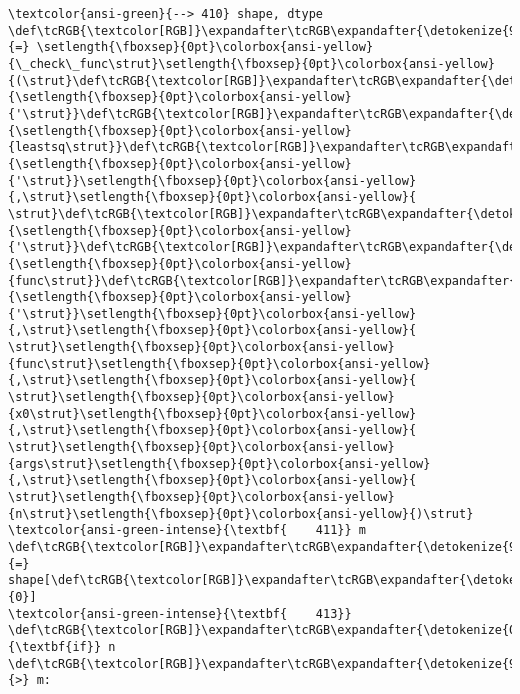 \documentclass[11pt]{article}
\begin{document}
\begin{Verbatim}[commandchars=\\\{\}, frame=single, framerule=2mm, rulecolor=\color{outerrorbackground}]
\textcolor{ansi-green}{--> 410} shape, dtype \def\tcRGB{\textcolor[RGB]}\expandafter\tcRGB\expandafter{\detokenize{98,98,98}}{=} \setlength{\fboxsep}{0pt}\colorbox{ansi-yellow}{\_check\_func\strut}\setlength{\fboxsep}{0pt}\colorbox{ansi-yellow}{(\strut}\def\tcRGB{\textcolor[RGB]}\expandafter\tcRGB\expandafter{\detokenize{175,0,0}}{\setlength{\fboxsep}{0pt}\colorbox{ansi-yellow}{'\strut}}\def\tcRGB{\textcolor[RGB]}\expandafter\tcRGB\expandafter{\detokenize{175,0,0}}{\setlength{\fboxsep}{0pt}\colorbox{ansi-yellow}{leastsq\strut}}\def\tcRGB{\textcolor[RGB]}\expandafter\tcRGB\expandafter{\detokenize{175,0,0}}{\setlength{\fboxsep}{0pt}\colorbox{ansi-yellow}{'\strut}}\setlength{\fboxsep}{0pt}\colorbox{ansi-yellow}{,\strut}\setlength{\fboxsep}{0pt}\colorbox{ansi-yellow}{ \strut}\def\tcRGB{\textcolor[RGB]}\expandafter\tcRGB\expandafter{\detokenize{175,0,0}}{\setlength{\fboxsep}{0pt}\colorbox{ansi-yellow}{'\strut}}\def\tcRGB{\textcolor[RGB]}\expandafter\tcRGB\expandafter{\detokenize{175,0,0}}{\setlength{\fboxsep}{0pt}\colorbox{ansi-yellow}{func\strut}}\def\tcRGB{\textcolor[RGB]}\expandafter\tcRGB\expandafter{\detokenize{175,0,0}}{\setlength{\fboxsep}{0pt}\colorbox{ansi-yellow}{'\strut}}\setlength{\fboxsep}{0pt}\colorbox{ansi-yellow}{,\strut}\setlength{\fboxsep}{0pt}\colorbox{ansi-yellow}{ \strut}\setlength{\fboxsep}{0pt}\colorbox{ansi-yellow}{func\strut}\setlength{\fboxsep}{0pt}\colorbox{ansi-yellow}{,\strut}\setlength{\fboxsep}{0pt}\colorbox{ansi-yellow}{ \strut}\setlength{\fboxsep}{0pt}\colorbox{ansi-yellow}{x0\strut}\setlength{\fboxsep}{0pt}\colorbox{ansi-yellow}{,\strut}\setlength{\fboxsep}{0pt}\colorbox{ansi-yellow}{ \strut}\setlength{\fboxsep}{0pt}\colorbox{ansi-yellow}{args\strut}\setlength{\fboxsep}{0pt}\colorbox{ansi-yellow}{,\strut}\setlength{\fboxsep}{0pt}\colorbox{ansi-yellow}{ \strut}\setlength{\fboxsep}{0pt}\colorbox{ansi-yellow}{n\strut}\setlength{\fboxsep}{0pt}\colorbox{ansi-yellow}{)\strut}
\textcolor{ansi-green-intense}{\textbf{    411}} m \def\tcRGB{\textcolor[RGB]}\expandafter\tcRGB\expandafter{\detokenize{98,98,98}}{=} shape[\def\tcRGB{\textcolor[RGB]}\expandafter\tcRGB\expandafter{\detokenize{98,98,98}}{0}]
\textcolor{ansi-green-intense}{\textbf{    413}} \def\tcRGB{\textcolor[RGB]}\expandafter\tcRGB\expandafter{\detokenize{0,135,0}}{\textbf{if}} n \def\tcRGB{\textcolor[RGB]}\expandafter\tcRGB\expandafter{\detokenize{98,98,98}}{>} m:


\end{Verbatim}
\end{document}

